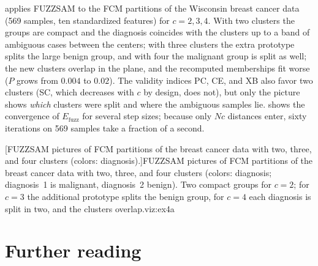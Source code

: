  applies FUZZSAM to the FCM partitions of the Wisconsin breast cancer data (569 samples, ten standardized features) for $c=2,3,4$. With two clusters the groups are compact and the diagnosis coincides with the clusters up to a band of ambiguous cases between the centers; with three clusters the extra prototype splits the large benign group, and with four the malignant group is split as well; the new clusters overlap in the plane, and the recomputed memberships fit worse ($P$ grows from $0.004$ to $0.02$). The validity indices PC, CE, and XB also favor two clusters (SC, which decreases with $c$ by design, does not), but only the picture shows \emph{which} clusters were split and where the ambiguous samples lie.  shows the convergence of $E_\text{fuzz}$ for several step sizes; because only $Nc$ distances enter, sixty iterations on 569 samples take a fraction of a second.

[FUZZSAM pictures of FCM partitions of the breast cancer data with two, three, and four clusters (colors: diagnosis).]{FUZZSAM pictures of FCM partitions of the breast cancer data with two, three, and four clusters (colors: diagnosis; diagnosis~1 is malignant, diagnosis~2 benign). Two compact groups for $c=2$; for $c=3$ the additional prototype splits the benign group, for $c=4$ each diagnosis is split in two, and the clusters overlap.}{viz:ex4a}

\section{Further reading}\label{sec:viz:reading}

